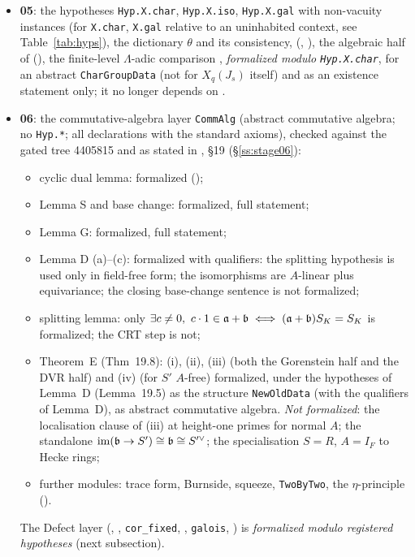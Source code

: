 \begin{itemize}
  explicit argument), its inverse limit \emph{formalized modulo } (the surjectivity of the
  $A$-transitions is an argument and is not formalized), Hecke operators with coefficients.
\item \textbf{05}: the hypotheses \texttt{Hyp.X.char}, \texttt{Hyp.X.iso}, \texttt{Hyp.X.gal} with non-vacuity instances (for \texttt{X.char}, \texttt{X.gal} relative to an uninhabited
  context, see Table~\ref{tab:hyps}), the
  dictionary $\theta$ and its consistency,  (,
  ), the algebraic half of  (), the finite-level
  $\Lambda$-adic comparison , \emph{formalized modulo \texttt{Hyp.X.char}}, for an abstract
  \texttt{CharGroupData} (not for $X_q(J_s)$ itself) and as an existence statement only; it no longer depends on
  .
\item \textbf{06}: the commutative-algebra layer \texttt{CommAlg} (abstract commutative algebra; no \texttt{Hyp.*}; all
  declarations with the standard axioms), checked against the gated tree 4405815 and as stated in \mainpdf, \S19 (\S\ref{ss:stage06}):
  \begin{itemize}
  \item cyclic dual lemma: formalized ();
  \item Lemma S and base change: formalized, full statement;
  \item Lemma G: formalized, full statement;
  \item Lemma D (a)--(c): formalized with qualifiers: the splitting hypothesis is used only in field-free form; the
    isomorphisms are $A$-linear plus equivariance; the closing base-change sentence is not formalized;
  \item splitting lemma: only $\exists c\ne0,\ c\cdot1\in\fa+\fb\iff(\fa+\fb)S_K=S_K$ is formalized; the CRT step is not;
  \item Theorem~E (Thm~19.8): (i), (ii), (iii) (both the Gorenstein half and the DVR half) and (iv) (for $S'$ $A$-free) formalized, under the hypotheses of Lemma~D (Lemma~19.5) as the structure \texttt{NewOldData} (with the qualifiers of Lemma~D), as abstract
    commutative algebra. \emph{Not formalized}: the localisation clause of (iii) at height-one primes for normal $A$; the
    standalone $\operatorname{im}(\mathfrak{b}\to S')\cong\mathfrak{b}\cong S'^\vee$; the specialisation $S=R$, $A=I_F$ to Hecke rings;
  \item further modules: trace form, Burnside, squeeze, \texttt{TwoByTwo}, the $\eta$-principle ().
  \end{itemize}
  The Defect layer (, , \texttt{cor\_fixed},
  , \texttt{galois}, ) is \emph{formalized modulo registered
  hypotheses} (next subsection).
\end{itemize}

